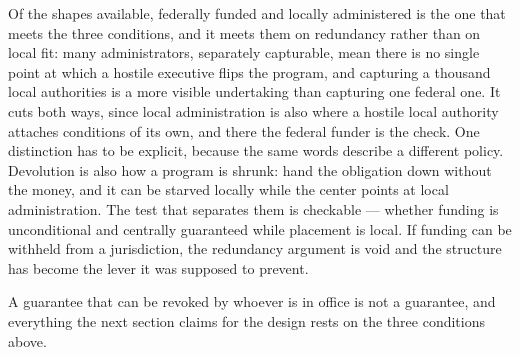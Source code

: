 Of the shapes available, federally funded and locally administered is the one that meets the three conditions, and it meets them on redundancy rather than on local fit: many administrators, separately capturable, mean there is no single point at which a hostile executive flips the program, and capturing a thousand local authorities is a more visible undertaking than capturing one federal one. It cuts both ways, since local administration is also where a hostile local authority attaches conditions of its own, and there the federal funder is the check. One distinction has to be explicit, because the same words describe a different policy. Devolution is also how a program is shrunk: hand the obligation down without the money, and it can be starved locally while the center points at local administration. The test that separates them is checkable — whether funding is unconditional and centrally guaranteed while placement is local. If funding can be withheld from a jurisdiction, the redundancy argument is void and the structure has become the lever it was supposed to prevent.

A guarantee that can be revoked by whoever is in office is not a guarantee, and everything the next section claims for the design rests on the three conditions above.
